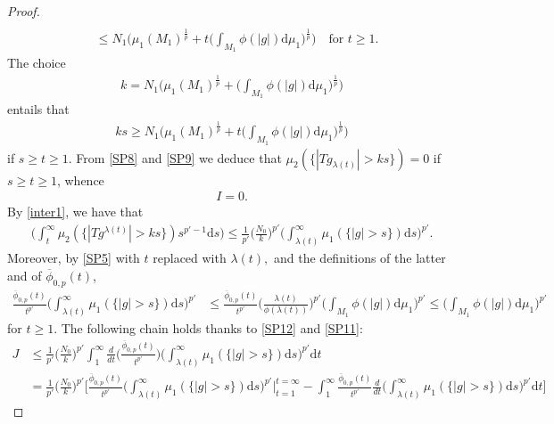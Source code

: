 \documentclass[10pt,a4paper]{amsart}
\def\d{\mathrm{d}}
\begin{document}
\begin{proof}
\begin{align}
\\ \nonumber & \leq N_1\bigg(\mu_1(M_1)^{\frac 1p} + t \bigg(\int_{M_1}\phi(|g|)\d \mu_1\bigg)^{\frac 1p}\bigg) \quad \text{for $t \geq 1$.} 
   \end{align}
   The choice
   \begin{align}\label{k} k= N_1 
       \bigg(\mu_1(M_1)^{\frac 1p} + \bigg(\int_{M_1}\phi(|g|)\d \mu_1\bigg)^{\frac 1p}\bigg)
   \end{align}
   entails that 
   \begin{align}
       \label{SP9}
       ks \geq N_1\bigg(\mu_1(M_1)^{\frac 1p} + t \bigg(\int_{M_1}\phi(|g|)\d \mu_1\bigg)^{\frac 1p}\bigg) 
   \end{align}
    if $s\geq t\geq 1$. From \eqref{SP8} and \eqref{SP9} we deduce that
    $\mu_2(\{|Tg_{\lambda(t)}|>ks\})=0$
    if $s\geq t\geq 1$, whence
    \begin{align}
        \label{SP10}
        I=0.
    \end{align}
    By \eqref{inter1}, we have that
\begin{align}
    \label{SP12}
\bigg(\int_t^\infty \mu_2(\{|Tg^{\lambda(t)}|>ks\})s^{p'-1}\d s\bigg)\leq  \frac{1}{p'} \Big(\frac{N_0}{k}\Big)^{p'}\bigg(\int_{\lambda (t)}^\infty \mu_1(\{|g|>s\})\d s\bigg)^{p'}.
\end{align}
Moreover, by \eqref{SP5} with $t$ replaced with $\lambda(t),$ and the 
definitions of  the latter and of  $\overline \phi_{0,p}(t)$,
    \begin{align}
        \label{SP11}
        \frac{  \overline \phi_{0,p}(t)}{t^{p'}} \bigg(\int_{\lambda (t)}^\infty \mu_1(\{|g|>s\})\d s\bigg)^{p'} & \leq \frac{\overline  \phi_{0,p}(t)}{t^{p'}}\bigg(\frac{\lambda (t)}{\phi (\lambda (t))}\bigg)^{p'} \bigg(\int_{M_1}\phi(|g|)\d \mu_1\bigg)^{p'}
\leq \bigg(\int_{M_1}\phi(|g|)\d \mu_1\bigg)^{p'}
    \end{align}
    for $t \geq 1$. 
    The following chain holds thanks to \eqref{SP12} and \eqref{SP11}:
    \begin{align}\label{SP14}
    J & \leq \frac{1}{p'} \Big(\frac{N_0}{k}\Big)^{p'}\int_1^\infty \frac{d}{dt}\bigg(\frac{\overline  \phi_{0,p}(t)}{t^{p'}} \bigg) \bigg(\int_{\lambda (t)}^\infty \mu_1(\{|g|>s\})\d s\bigg)^{p'}  \d t 
    \\ \nonumber &
    = \frac{1}{p'} \Big(\frac{N_0}{k}\Big)^{p'}\bigg[ \frac{\overline  \phi_{0,p}(t)}{t^{p'}}
    \bigg(\int_{\lambda (t)}^\infty \mu_1(\{|g|>s\})\d s\bigg)^{p'}\bigg|_{t=1}^{t=\infty} - 
    \int_1^\infty \frac{ \overline \phi_{0,p}(t)}{t^{p'}} \frac{d}{dt}\bigg(\int_{\lambda (t)}^\infty \mu_1(\{|g|>s\})\d s\bigg)^{p'}  \d t \bigg]

\end{align}
\end{proof}
\end{document}
